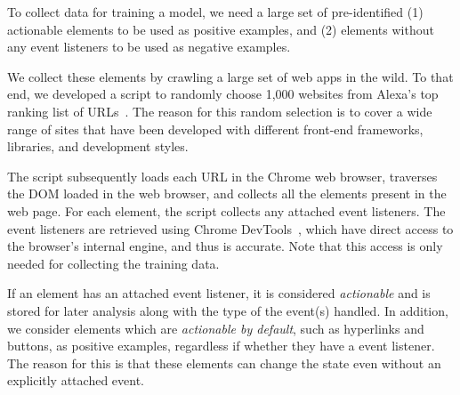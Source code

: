 To collect data for training a model, 
we need a large set of pre-identified (1)  actionable elements to be used 
as positive examples, and (2) elements without any event listeners to be used as negative examples.

We collect these elements by crawling a large set of web apps in the wild.
To that end, we developed a script to randomly choose 1,000 websites
from Alexa's top ranking list of URLs~\cite{alexa-ranking}.
The reason for this random selection is 
to cover a wide range of sites 
that have been developed with different front-end frameworks, libraries, and development styles.

The script subsequently loads each URL in the Chrome web browser, 
traverses the DOM loaded in the web browser,
and collects all the \html elements present in the web page.
For each element, the script collects any attached event listeners.
The event listeners are retrieved using Chrome DevTools~\cite{chrome-dev-tools},
which have direct access to the browser's internal engine,
and thus is accurate. Note that this access is only needed for collecting the training data. %

If an element has an attached event listener,
it is considered \emph{actionable} and is stored for
later analysis along with the type of the event(s) handled.
In addition, we consider \html elements which are \textit{actionable by default}, 
such as hyperlinks and buttons, as positive examples, regardless if whether they have a \js event listener.
The reason for this is that these elements can change the state even without
an explicitly attached \js event.

